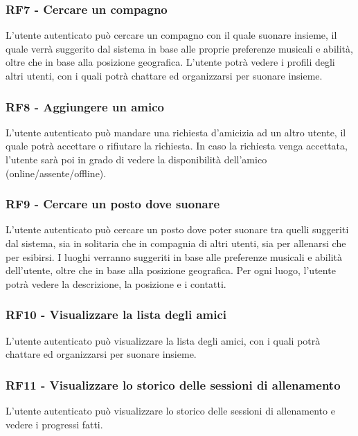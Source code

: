 \documentclass[12pt, a4paper]{article}
\begin{document}
\subsubsection{RF7 - Cercare un compagno}

L'utente autenticato può cercare un compagno con il quale suonare insieme, il quale verrà suggerito dal sistema in base alle proprie preferenze musicali e abilità, oltre che in base alla posizione geografica. L'utente potrà vedere i profili degli altri utenti, con i quali potrà chattare ed organizzarsi per suonare insieme.

\subsubsection{RF8 - Aggiungere un amico}

L'utente autenticato può mandare una richiesta d'amicizia ad un altro utente, il quale potrà accettare o rifiutare la richiesta. In caso la richiesta venga accettata, l'utente sarà poi in grado di vedere la disponibilità dell'amico (online/assente/offline).

\subsubsection{RF9 - Cercare un posto dove suonare}

L'utente autenticato può cercare un posto dove poter suonare tra quelli suggeriti dal sistema, sia in solitaria che in compagnia di altri utenti, sia per allenarsi che per esibirsi. I luoghi verranno suggeriti in base alle preferenze musicali e abilità dell'utente, oltre che in base alla posizione geografica. Per ogni luogo, l'utente potrà vedere la descrizione, la posizione e i contatti.

\subsubsection{RF10 - Visualizzare la lista degli amici}

L'utente autenticato può visualizzare la lista degli amici, con i quali potrà chattare ed organizzarsi per suonare insieme.

\subsubsection{RF11 - Visualizzare lo storico delle sessioni di allenamento}

L'utente autenticato può visualizzare lo storico delle sessioni di allenamento e vedere i progressi fatti.
\end{document}
